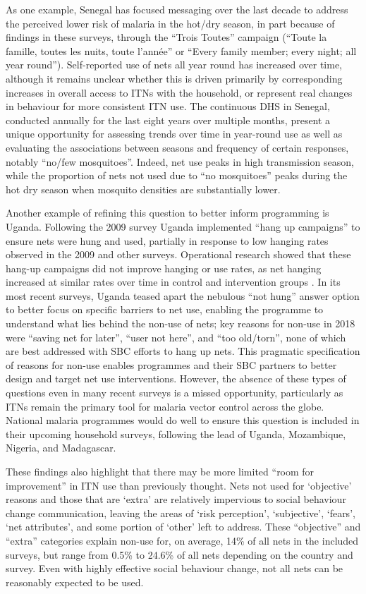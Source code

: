 \documentclass[review,
3p]{elsarticle} %
\begin{document}
As one example, Senegal has focused messaging over the last decade to
address the perceived lower risk of malaria in the hot/dry season, in
part because of findings in these surveys, through the ``Trois Toutes''
campaign (``Toute la famille, toutes les nuits, toute l'année'' or
``Every family member; every night; all year round''). Self-reported use
of nets all year round has increased over time, although it remains
unclear whether this is driven primarily by corresponding increases in
overall access to ITNs with the household, or represent real changes in
behaviour for more consistent ITN use. The continuous DHS in Senegal,
conducted annually for the last eight years over multiple months,
present a unique opportunity for assessing trends over time in
year-round use as well as evaluating the associations between seasons
and frequency of certain responses, notably ``no/few mosquitoes''.
Indeed, net use peaks in high transmission season, while the proportion
of nets not used due to ``no mosquitoes'' peaks during the hot dry
season when mosquito densities are substantially lower.

Another example of refining this question to better inform programming
is Uganda. Following the 2009 survey Uganda implemented ``hang up
campaigns'' to ensure nets were hung and used, partially in response to
low hanging rates observed in the 2009 and other surveys. Operational
research showed that these hang-up campaigns did not improve hanging or
use rates, as net hanging increased at similar rates over time in
control and intervention groups \citep{Anonymous:2015ff}. In its most
recent surveys, Uganda teased apart the nebulous ``not hung'' answer
option to better focus on specific barriers to net use, enabling the
programme to understand what lies behind the non-use of nets; key
reasons for non-use in 2018 were ``saving net for later'', ``user not
here'', and ``too old/torn'', none of which are best addressed with SBC
efforts to hang up nets. This pragmatic specification of reasons for
non-use enables programmes and their SBC partners to better design and
target net use interventions. However, the absence of these types of
questions even in many recent surveys is a missed opportunity,
particularly as ITNs remain the primary tool for malaria vector control
across the globe. National malaria programmes would do well to ensure
this question is included in their upcoming household surveys, following
the lead of Uganda, Mozambique, Nigeria, and Madagascar.

These findings also highlight that there may be more limited ``room for
improvement'' in ITN use than previously thought. Nets not used for
`objective' reasons and those that are `extra' are relatively impervious
to social behaviour change communication, leaving the areas of `risk
perception', `subjective', `fears', `net attributes', and some portion
of `other' left to address. These ``objective'' and ``extra'' categories
explain non-use for, on average, 14\% of all nets in the included
surveys, but range from 0.5\% to 24.6\% of all nets depending on the
country and survey. Even with highly effective social behaviour change,
not all nets can be reasonably expected to be used.
\end{document}
